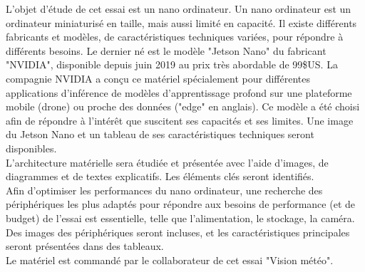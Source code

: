 ﻿\noindent L'objet d'étude de cet essai est un nano ordinateur. Un nano ordinateur est un ordinateur miniaturisé en taille, mais aussi limité en capacité. Il existe différents fabricants et modèles, de caractéristiques techniques variées, pour répondre à différents besoins. Le dernier né est le modèle "Jetson Nano" du fabricant "NVIDIA", disponible depuis juin 2019 au prix très abordable de 99\$US. La compagnie NVIDIA a conçu ce matériel spécialement pour différentes applications d'inférence de modèles d'apprentissage profond sur une plateforme mobile (drone) ou proche des données ("edge" en anglais). Ce modèle a été choisi afin de répondre à l'intérêt que suscitent ses capacités et ses limites. Une image du Jetson Nano et un tableau de ses caractéristiques techniques seront disponibles. 
\vspace{\baselineskip}
\\
\noindent L'architecture matérielle sera étudiée et présentée avec l'aide d'images, de diagrammes et de textes explicatifs. Les éléments clés seront identifiés.
\vspace{\baselineskip}
\\
\noindent Afin d'optimiser les performances du nano ordinateur, une recherche des périphériques les plus adaptés pour répondre aux besoins de performance (et de budget) de l'essai est essentielle, telle que l'alimentation, le stockage, la caméra. Des images des périphériques seront incluses, et les caractéristiques principales seront présentées dans des tableaux.
\vspace{\baselineskip}
\\
\noindent Le matériel est commandé par le collaborateur de cet essai "Vision météo".